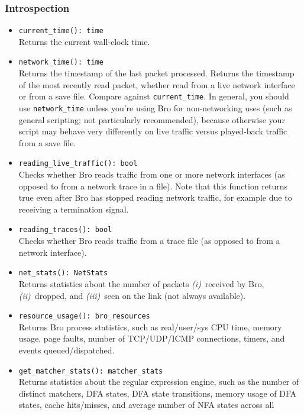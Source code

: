 \documentclass[10pt,landscape]{article}
\newcommand{\first}{\emph{(i)}~}
\newcommand{\second}{\emph{(ii)}~}
\newcommand{\third}{\emph{(iii)}~}
\begin{document}
\begin{multicols*}{2}
\subsubsection*{Introspection}

\begin{itemize}
  \item \verb|current_time(): time|\\
    Returns the current wall-clock time.
  \item \verb|network_time(): time|\\
    Returns the timestamp of the last packet processed.
    Returns the timestamp of the most recently read packet, whether read from a
    live network interface or from a save file. Compare against
    \verb|current_time|. In general, you should use \verb|network_time| unless
    you're using Bro for non-networking uses (such as general scripting; not
    particularly recommended), because otherwise your script may behave very
    differently on live traffic versus played-back traffic from a save file.
  \item \verb|reading_live_traffic(): bool|\\
    Checks whether Bro reads traffic from one or more network interfaces (as
    opposed to from a network trace in a file). Note that this function returns
    true even after Bro has stopped reading network traffic, for example due to
    receiving a termination signal.
  \item \verb|reading_traces(): bool|\\
    Checks whether Bro reads traffic from a trace file (as opposed to
    from a network interface).
  \item \verb|net_stats(): NetStats|\\
    Returns statistics about the number of packets
    \first received by Bro,
    \second dropped,
    and \third seen on the link (not always available).
  \item \verb|resource_usage(): bro_resources|\\
    Returns Bro process statistics, such as real/user/sys CPU time, memory
    usage, page faults, number of TCP/UDP/ICMP connections, timers, and events
    queued/dispatched.
  \item \verb|get_matcher_stats(): matcher_stats|\\
    Returns statistics about the regular expression engine, such as the number
    of distinct matchers, DFA states, DFA state transitions, memory usage of
    DFA states, cache hits/misses, and average number of NFA states across all

\end{itemize}
\end{multicols*}
\end{document}
